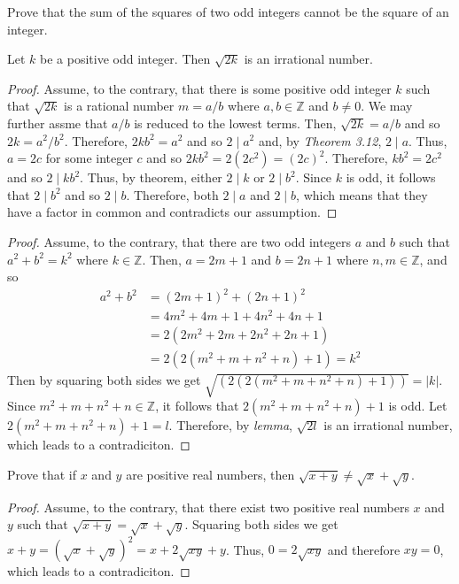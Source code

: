\documentclass[12pt]{article}
\newcommand{\Z}{\mathbb{Z}}
\newenvironment{lemma}[2][Lemma]{\begin{trivlist}
		\item[\hskip \labelsep {\bfseries #1}\hskip \labelsep {\bfseries #2.}]}{\end{trivlist}}
\newenvironment{problem}[2][Problem]{\begin{trivlist}
		\item[\hskip \labelsep {\bfseries #1}\hskip \labelsep {\bfseries #2.}]}{\end{trivlist}}
\begin{document}
	\begin{problem}{26}
		Prove that the sum of the squares of two odd integers cannot be the square of an integer.
		\begin{lemma}{1}
			Let $k$ be a positive odd integer. Then $\sqrt{2k}$ is an irrational number.
			\begin{proof}
				Assume, to the contrary, that there is some positive odd integer $k$ such that $\sqrt{2k}$ is a rational number $m = a/b$ where $a,b\in \Z$ and $b\neq 0$. We may further assme that $a/b$ is reduced to the lowest terms. Then, $\sqrt{2k} = a/b$ and so $2k = a^{2}/b^{2}$. Therefore, $2kb^{2} = a^{2}$ and so $2\mid a^{2}$ and, by \textit{Theorem 3.12}, $2\mid a$. Thus, $a=2c$ for some integer $c$ and so $2kb^{2} = 2(2c^{2}) = (2c)^{2}$. Therefore, $kb^{2} = 2c^{2}$ and so $2\mid kb^{2}$. Thus, by theorem, either $2\mid k$ or $2\mid b^{2}$. Since $k$ is odd, it follows that $2\mid b^{2}$ and so $2\mid b$. Therefore, both $2\mid a$ and $2\mid b$, which means that they have a factor in common and contradicts our assumption.
			\end{proof}
		\end{lemma}
		\begin{proof}
			Assume, to the contrary, that there are two odd integers $a$ and $b$ such that $a^{2}+b^{2} = k^{2}$ where $k\in \Z$. Then, $a=2m+1$ and $b=2n+1$ where $n,m\in \Z$, and so
			\begin{align*}
			 a^{2}+b^{2} &= (2m+1)^{2}+(2n+1)^{2} \\
			 &= 4m^{2}+4m+1+4n^{2}+4n+1 \\
			 &= 2(2m^{2}+2m+2n^{2}+2n+1)\\
			 &= 2(2(m^{2}+m+n^{2}+n)+1) = k^{2}
		 	\end{align*}
	 Then by squaring both sides we get $\sqrt{(2(2(m^{2}+m+n^{2}+n)+1))} = |k|$. Since $m^{2}+m+n^{2}+n\in \Z$, it follows that $2(m^{2}+m+n^{2}+n)+1$ is odd. Let $2(m^{2}+m+n^{2}+n)+1=l$. Therefore, by \textit{lemma}, $\sqrt{2l}$ is an irrational number, which leads to a contradiciton.
		\end{proof}
	\end{problem}

	\begin{problem}{27}
		Prove that if $x$ and $y$ are positive real numbers, then $\sqrt{x+y}\neq \sqrt{x}+\sqrt{y}$.
		\begin{proof}
			Assume, to the contrary, that there exist two positive real numbers $x$ and $y$ such that $\sqrt{x+y}= \sqrt{x}+\sqrt{y}$. Squaring both sides we get $x+y = (\sqrt{x}+\sqrt{y})^{2}=x+2\sqrt{xy}+y$. Thus, $0 = 2\sqrt{xy}$ and therefore $xy= 0$, which leads to a contradiciton.
		\end{proof}
	\end{problem} 
\end{document}
